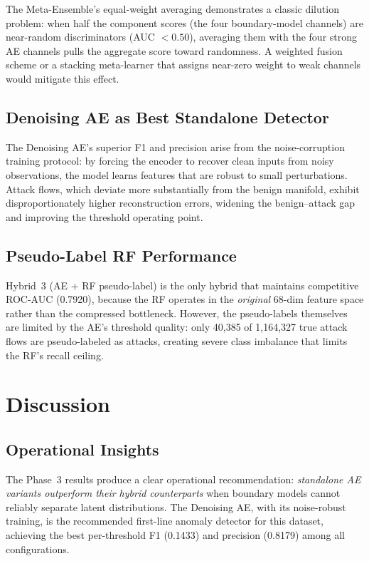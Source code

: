 \documentclass[10pt,conference]{IEEEtran}
\begin{document}
The Meta-Ensemble's equal-weight averaging demonstrates a classic
dilution problem: when half the component scores (the four boundary-model
channels) are near-random discriminators (AUC $<0.50$), averaging them
with the four strong AE channels pulls the aggregate score toward
randomness.  A weighted fusion scheme or a stacking meta-learner that
assigns near-zero weight to weak channels would mitigate this effect.

\subsection{Denoising AE as Best Standalone Detector}

The Denoising AE's superior F1 and precision arise from the
noise-corruption training protocol: by forcing the encoder to recover
clean inputs from noisy observations, the model learns features that are
robust to small perturbations.  Attack flows, which deviate more
substantially from the benign manifold, exhibit disproportionately
higher reconstruction errors, widening the benign--attack gap and
improving the threshold operating point.

\subsection{Pseudo-Label RF Performance}

Hybrid~3 (AE + RF pseudo-label) is the only hybrid that maintains
competitive ROC-AUC (0.7920), because the RF operates in the
\emph{original} 68-dim feature space rather than the compressed
bottleneck.  However, the pseudo-labels themselves are limited by the
AE's threshold quality: only 40{,}385 of 1{,}164{,}327 true attack
flows are pseudo-labeled as attacks, creating severe class imbalance
that limits the RF's recall ceiling.

\section{Discussion}
\label{sec:discussion}

\subsection{Operational Insights}

The Phase~3 results produce a clear operational recommendation:
\emph{standalone AE variants outperform their hybrid counterparts} when
boundary models cannot reliably separate latent distributions.  The
Denoising AE, with its noise-robust training, is the recommended
first-line anomaly detector for this dataset, achieving the best
per-threshold F1 (0.1433) and precision (0.8179) among all
configurations.
\end{document}
